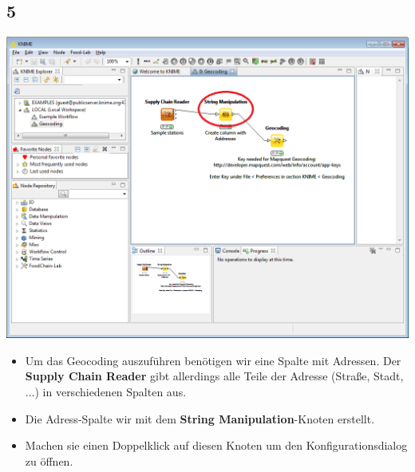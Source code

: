\documentclass{beamer}
\begin{document}
\subsection{5}
\begin{frame}
	\begin{center}
  		\includegraphics[height=0.5\textheight]{5.png}
	\end{center}
	\begin{itemize}
		\item Um das Geocoding auszuführen benötigen wir eine Spalte mit Adressen. Der \textbf{Supply Chain Reader} gibt allerdings alle Teile der Adresse (Straße, Stadt, ...) in verschiedenen Spalten aus.
		\item Die Adress-Spalte wir mit dem \textbf{String Manipulation}-Knoten erstellt.
		\item Machen sie einen Doppelklick auf diesen Knoten um den Konfigurationsdialog zu öffnen.
	\end{itemize}
\end{frame}
\end{document}
